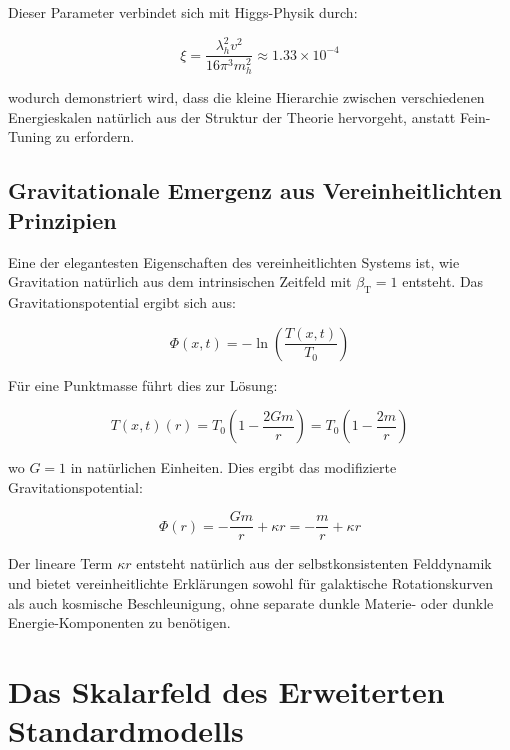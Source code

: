\documentclass[12pt,a4paper]{article}
\newcommand{\Tfieldt}{T(x,t)}
\newcommand{\betaT}{\beta_{\text{T}}}
\newcommand{\Tzero}{T_0}
\newcommand{\xipar}{\xi}
\begin{document}
	Dieser Parameter verbindet sich mit Higgs-Physik durch:
	
	\begin{equation}
		\xipar = \frac{\lambda_h^2 v^2}{16\pi^3 m_h^2} \approx 1.33 \times 10^{-4}
	\end{equation}
	
	wodurch demonstriert wird, dass die kleine Hierarchie zwischen verschiedenen Energieskalen natürlich aus der Struktur der Theorie hervorgeht, anstatt Fein-Tuning zu erfordern.
	
	\subsection{Gravitationale Emergenz aus Vereinheitlichten Prinzipien}
	\label{subsec:gravitational_emergence_unified}
	
	Eine der elegantesten Eigenschaften des vereinheitlichten Systems ist, wie Gravitation natürlich aus dem intrinsischen Zeitfeld mit $\betaT = 1$ entsteht. Das Gravitationspotential ergibt sich aus:
	
	\begin{equation}
		\Phi(x,t) = -\ln\left(\frac{\Tfieldt}{\Tzero}\right)
	\end{equation}
	
	Für eine Punktmasse führt dies zur Lösung:
	
	\begin{equation}
		\Tfieldt(r) = \Tzero\left(1 - \frac{2Gm}{r}\right) = \Tzero\left(1 - \frac{2m}{r}\right)
	\end{equation}
	
	wo $G = 1$ in natürlichen Einheiten. Dies ergibt das modifizierte Gravitationspotential:
	
	\begin{equation}
		\Phi(r) = -\frac{Gm}{r} + \kappa r = -\frac{m}{r} + \kappa r
	\end{equation}
	
	Der lineare Term $\kappa r$ entsteht natürlich aus der selbstkonsistenten Felddynamik und bietet vereinheitlichte Erklärungen sowohl für galaktische Rotationskurven als auch kosmische Beschleunigung, ohne separate dunkle Materie- oder dunkle Energie-Komponenten zu benötigen.
	
	\section{Das Skalarfeld des Erweiterten Standardmodells}
	\label{sec:esm_scalar_field}
	
\end{document}
